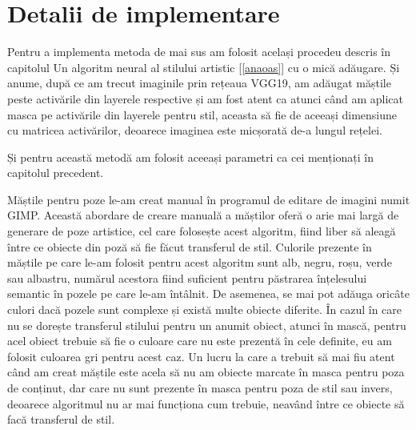 \section{Detalii de implementare}
Pentru a implementa metoda de mai sus am folosit același procedeu descris în capitolul Un algoritm neural al stilului artistic [\ref{anaoas}] cu o mică adăugare. Și anume, după ce am trecut imaginile prin rețeaua VGG19, am adăugat măștile peste activările din layerele respective și am fost atent ca atunci când am aplicat masca pe activările din layerele pentru stil, aceasta să fie de aceeași dimensiune cu matricea activărilor, deoarece imaginea este micșorată de-a lungul rețelei.

Și pentru această metodă am folosit aceeași parametri ca cei menționați în capitolul precedent.

Măștile pentru poze le-am creat manual în programul de editare de imagini numit GIMP. Această abordare de creare manuală a măștilor oferă o arie mai largă de generare de poze artistice, cel care folosește acest algoritm, fiind liber să aleagă între ce obiecte din poză să fie făcut transferul de stil. Culorile prezente în măștile pe care le-am folosit pentru acest algoritm sunt alb, negru, roșu, verde sau albastru, numărul acestora fiind suficient pentru păstrarea înțelesului semantic în pozele pe care le-am întâlnit. De asemenea, se mai pot adăuga oricâte culori dacă pozele sunt complexe și există multe obiecte diferite. În cazul în care nu se dorește transferul stilului pentru un anumit obiect, atunci în mască, pentru acel obiect trebuie să fie o culoare care nu este prezentă în cele definite, eu am folosit culoarea gri pentru acest caz. Un lucru la care a trebuit să mai fiu atent când am creat măștile este acela să nu am obiecte marcate în masca pentru poza de conținut, dar care nu sunt prezente în masca pentru poza de stil sau invers, deoarece algoritmul nu ar mai funcționa cum trebuie, neavând între ce obiecte să facă transferul de stil.

\newpage
